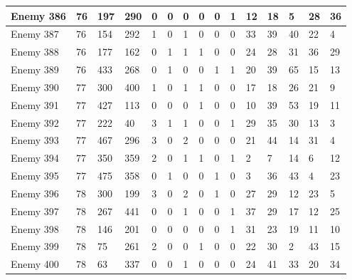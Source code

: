 \begin{sidewaystable}[!h]
{\begin{tabular}{|l|l|l|l|l|l|l|l|l|l|l|l|l|l|l|}
			Enemy 386 & 76 & 197 & 290 & 0 & 0 & 0 & 0 & 0 & 1 & 12 & 18 & 5 & 28 & 36 \\ \hline
			Enemy 387 & 76 & 154 & 292 & 1 & 0 & 1 & 0 & 0 & 0 & 33 & 39 & 40 & 22 & 4 \\ \hline
			Enemy 388 & 76 & 177 & 162 & 0 & 1 & 1 & 1 & 0 & 0 & 24 & 28 & 31 & 36 & 29 \\ \hline
			Enemy 389 & 76 & 433 & 268 & 0 & 1 & 0 & 0 & 1 & 1 & 20 & 39 & 65 & 15 & 13 \\ \hline
			Enemy 390 & 77 & 300 & 400 & 1 & 0 & 1 & 1 & 0 & 0 & 17 & 18 & 26 & 21 & 9 \\ \hline
			Enemy 391 & 77 & 427 & 113 & 0 & 0 & 0 & 1 & 0 & 0 & 10 & 39 & 53 & 19 & 11 \\ \hline
			Enemy 392 & 77 & 222 & 40 & 3 & 1 & 1 & 0 & 0 & 1 & 29 & 35 & 30 & 13 & 3 \\ \hline
			Enemy 393 & 77 & 467 & 296 & 3 & 0 & 2 & 0 & 0 & 0 & 21 & 44 & 14 & 31 & 4 \\ \hline
			Enemy 394 & 77 & 350 & 359 & 2 & 0 & 1 & 1 & 0 & 1 & 2 & 7 & 14 & 6 & 12 \\ \hline
			Enemy 395 & 77 & 475 & 358 & 0 & 1 & 0 & 0 & 1 & 0 & 3 & 36 & 43 & 4 & 23 \\ \hline
			Enemy 396 & 78 & 300 & 199 & 3 & 0 & 2 & 0 & 1 & 0 & 27 & 29 & 12 & 23 & 5 \\ \hline
			Enemy 397 & 78 & 267 & 441 & 0 & 0 & 1 & 0 & 0 & 1 & 37 & 29 & 17 & 12 & 25 \\ \hline
			Enemy 398 & 78 & 146 & 201 & 0 & 0 & 0 & 0 & 0 & 1 & 31 & 23 & 19 & 11 & 10 \\ \hline
			Enemy 399 & 78 & 75 & 261 & 2 & 0 & 0 & 1 & 0 & 0 & 22 & 30 & 2 & 43 & 15 \\ \hline
			Enemy 400 & 78 & 63 & 337 & 0 & 0 & 1 & 0 & 0 & 0 & 24 & 41 & 33 & 20 & 34 \\ \hline
		\end{tabular}%
	}
\end{sidewaystable}
\clearpage